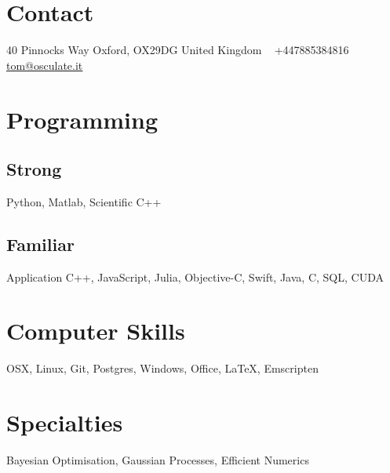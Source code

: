 \documentclass[4pt, print]{friggeri-cv}
\begin{document}

\begin{aside}
  \section{Contact}
    40 Pinnocks Way
    Oxford, OX29DG
    United Kingdom
    ~
    +447885384816
    \href{mailto:tom@osculate.it}{tom@osculate.it}
  \section{Programming}
  \subsection{Strong}
  Python, Matlab, 
  Scientific C++
  \subsection{Familiar}
  Application C++,
  JavaScript, Julia,
  Objective-C, Swift,
  Java, C, SQL, CUDA
  \section{Computer Skills}
  OSX, Linux,  Git,
 Postgres, Windows,
  Office, \LaTeX,
  Emscripten
  \section{Specialties}
  Bayesian Optimisation,
  Gaussian Processes,
  Efficient Numerics
\end{aside}


\end{document}
